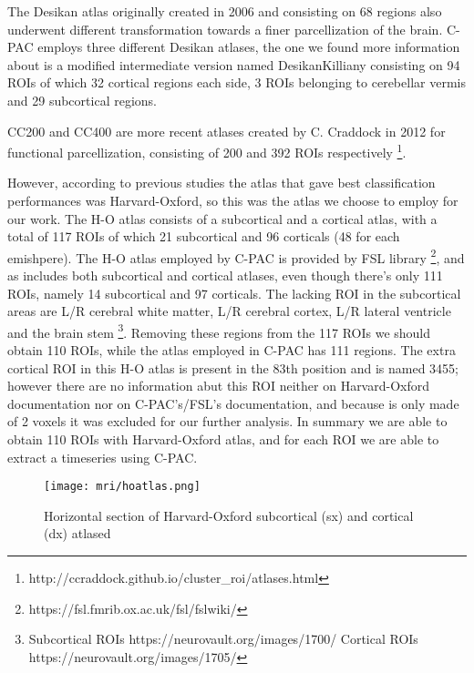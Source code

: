 \documentclass[11pt]{report}
\begin{document}
The Desikan atlas \cite{desikan2006} originally created in 2006 and consisting on 68 regions also underwent different transformation towards a finer parcellization of the brain. C-PAC employs three different Desikan atlases, the one we found more information about is a modified intermediate version named DesikanKilliany consisting on 94 ROIs of which 32 cortical regions each side, 3 ROIs belonging to cerebellar vermis and 29 subcortical regions.

CC200 and CC400 are more recent atlases created by C. Craddock in 2012 \cite{craddock2012} for functional parcellization, consisting of 200 and 392 ROIs respectively \footnote{http://ccraddock.github.io/cluster\_roi/atlases.html}.

However, according to previous studies \cite{spera-2019} the atlas that gave best classification performances was Harvard-Oxford, so this was the atlas we choose to employ for our work.
The H-O atlas consists of a subcortical and a cortical atlas, with a total of 117 ROIs of which 21 subcortical and 96 corticals (48 for each emishpere).
The H-O atlas employed by C-PAC is provided by FSL library \footnote{https://fsl.fmrib.ox.ac.uk/fsl/fslwiki/}, and as includes both subcortical and cortical atlases, even though there's only 111 ROIs, namely 14 subcortical and 97 corticals.
The lacking ROI in the subcortical areas are L/R cerebral white matter, L/R cerebral cortex, L/R lateral ventricle and the brain stem \footnote{Subcortical ROIs https://neurovault.org/images/1700/ \quad Cortical ROIs https://neurovault.org/images/1705/ }.
Removing these regions from the 117 ROIs we should obtain 110 ROIs, while the atlas employed in C-PAC has 111 regions.
The extra cortical ROI in this H-O atlas is present in the 83th position and is named 3455; however there are no information abut this ROI neither on Harvard-Oxford documentation nor on C-PAC's/FSL's documentation, and because is only made of 2 voxels it was excluded for our further analysis.
In summary we are able to obtain 110 ROIs with Harvard-Oxford atlas, and for each ROI we are able to extract a timeseries using C-PAC.

\begin{figure}[h]
\centering
\texttt{[image: mri/hoatlas.png]}
\caption{Horizontal section of Harvard-Oxford subcortical (sx) and cortical (dx) atlased}
\label{fig:hoatlas}
\end{figure}
\end{document}
